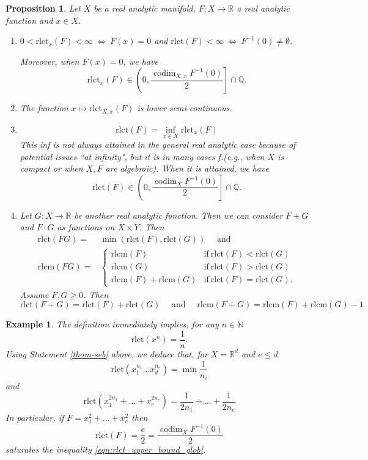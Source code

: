 \documentclass[a4paper]{amsart}
\DeclareMathOperator{\codim}{\mathrm{codim}}
\newcommand{\R}{\mathbb{R}}
\newcommand{\Q}{\mathbb{Q}}
\newcommand{\N}{\mathbb{N}}
\newcommand{\rlct}{\mathrm{rlct}}
\newcommand{\rlcm}{\mathrm{rlcm}}
\newtheorem{prop}[thm]{Proposition}
\theoremstyle{plain}
\newtheorem{example}[thm]{Example}
\begin{document}
\begin{prop}\label{prop:rlct_elem}
    Let $X$ be a real analytic manifold, $F:X\to \R$ a real analytic function and $x\in X$. 
\begin{enumerate}[label=(\roman*)]
\item $0<\rlct_x(F)<\infty\ \Leftrightarrow\ F(x)=0$ and $\rlct(F)<\infty\ \Leftrightarrow\ F^{-1}(0)\neq\emptyset$. 

Moreover, when $F(x)=0$, we have
\begin{equation}\label{eqn:rlct_upper_bound}
    \rlct_{x}(F)\in \left(0, \frac{\codim_{X,x} F^{-1}(0)}{2}\right]\cap \Q.
\end{equation}
\item The function $x\mapsto\rlct_{X,x}(F)$ is lower semi-continuous.
\item \[
\rlct(F)=\inf_{x\in X}\rlct_{x}(F)
\]
This inf is not always attained in the general real analytic case because of potential issues ``at infinity", but it is in many cases f.(e.g., when $X$ is compact or when $X,F$ are algebraic). When it is attained, we have 
\begin{equation}\label{eqn:rlct_upper_bound_glob}
    \rlct(F)\in \left(0, \frac{\codim_X F^{-1}(0)}{2}\right]\cap \Q.
\end{equation}
\item\label{thom-seb} Let $G:X\to \R$ be another real analytic function. Then we can consider $F+G$ and $F\cdot G$ as functions on $X\times Y$. Then
\begin{eqnarray*}
\rlct(FG)  =& \min(\rlct(F),\rlct(G))\quad \text{ and }
\\ \rlcm(FG) =&\left\{\begin{array}{cl}
  \rlcm(F)   & \text{if}\ \rlct(F)<\rlct(G) \\
   \rlcm(G)  & \text{if}\ \rlct(F)>\rlct(G) \\
   \rlcm(F)+\rlcm(G)  & \text{if}\ \rlct(F)=\rlct(G).
\end{array}\right.
\end{eqnarray*}
Assume $F,G\geq 0$. Then
\[
\rlct(F+G)=\rlct(F)+\rlct(G)\quad \text{ and }\quad \rlcm(F+G)=\rlcm(F)+\rlcm(G)-1
\]
\end{enumerate}
\end{prop}

\begin{example}\label{ex:rclts} \rm
The definition immediately implies, for any $n\in \N$
\[
\rlct(x^n)=\frac{1}{n}.
\]
Using Statement \ref{thom-seb} above, we deduce that, for $X=\R^d$ and $e\leq d$
\[
\rlct(x_1^{n_1}\ldots x_d^{n_e})= \min \frac{1}{n_i}
\]
and
\[
\rlct(x_1^{2n_1}+\ldots+x_e^{2n_e})=\frac{1}{2n_1}+\ldots+\frac{1}{2n_e}
\]
In particular, if $F=x_1^{2}+\ldots+x_e^{2}$ then
\[
\rlct(F)=\frac{e}{2}=\frac{\codim_X F^{-1}(0)}{2}
\]
saturates the inequality \eqref{eqn:rlct_upper_bound_glob}.
\end{example}
\end{document}
